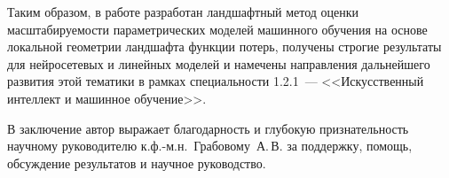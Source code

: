 Таким образом, в работе разработан ландшафтный метод оценки масштабируемости параметрических моделей машинного обучения на основе локальной геометрии ландшафта функции потерь, получены строгие результаты для нейросетевых и линейных моделей и намечены направления дальнейшего развития этой тематики в рамках специальности 1.2.1~--- <<Искусственный интеллект и машинное обучение>>.

В заключение автор выражает благодарность и глубокую признательность научному руководителю к.ф.-м.н.~Грабовому~А.\,В. за поддержку, помощь, обсуждение результатов и научное руководство.